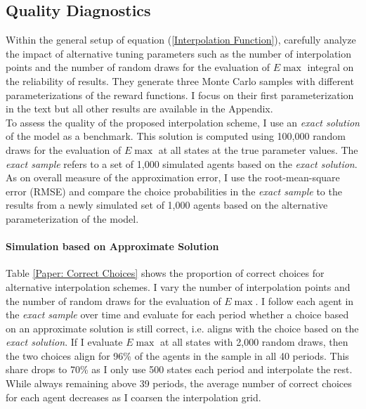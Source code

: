 \subsection{Quality Diagnostics}
Within the general setup of equation (\ref{Interpolation Function}), \citet{Keane.1994} carefully analyze the impact of alternative tuning parameters such as the number of interpolation points and the number of random draws for the evaluation of $E\max$ integral on the reliability of results. They generate three Monte Carlo samples with different parameterizations of the reward functions. I focus on their first parameterization in the text but all other results are available in the Appendix.\\\newline
%
To assess the quality of the proposed interpolation scheme, I use an \textit{exact solution} of the model as a benchmark. This solution is computed using 100,000 random draws for the evaluation of $E\max$ at all states at the true parameter values. The \textit{exact sample} refers to a set of 1,000 simulated agents based on the \textit{exact solution}. As on overall measure of the approximation error, I use the root-mean-square error (RMSE) and compare the choice probabilities in the \textit{exact sample} to the results from a newly simulated set of 1,000 agents based on the alternative parameterization of the model.
\paragraph{Simulation based on Approximate Solution}
Table \ref{Paper: Correct Choices} shows the proportion of correct choices for alternative interpolation schemes. I vary the number of interpolation points and the number of random draws for the evaluation of $E\max$. I follow each agent in the \textit{exact sample} over time and evaluate for each period whether a choice based on an approximate solution is still correct, i.e. aligns with the choice based on the \textit{exact solution}. If I evaluate $E\max$ at all states with 2,000 random draws, then the two choices align for 96\% of the agents in the sample in all 40 periods. This share drops to 70\% as I only use 500 states each period and interpolate the rest. While always remaining above 39 periods, the average number of correct choices for each agent decreases as I coarsen the interpolation grid.

